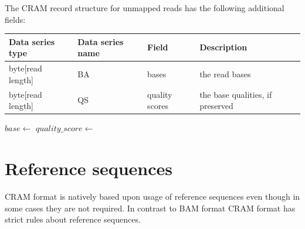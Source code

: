\documentclass[a4paper]{article}
\begin{document}
The CRAM record structure for unmapped reads has the following additional fields:

\begin{tabular}{|>{\raggedright}p{88pt}|>{\raggedright}p{83pt}|>{\raggedright}p{85pt}|>{\raggedright}p{180pt}|}
\hline
\textbf{Data series type} & \textbf{Data series name} & \textbf{Field} & \textbf{Description}\tabularnewline
\hline
byte[read length] & BA & bases & the read bases\tabularnewline
\hline
byte[read length] & QS & quality scores & the base qualities, if preserved\tabularnewline
\hline
\end{tabular}

\vskip20pt
\begin{algorithmic}[1]
    \State $base\gets$ 
  \EndFor
      \State $quality\_score\gets$ 
    \EndFor
  \EndIf
\EndProcedure
\end{algorithmic}

\section{\textbf{Reference sequences}}

CRAM format is natively based upon usage of reference sequences even though in 
some cases they are not required. In contrast to BAM format CRAM format has strict 
rules about reference sequences. 
\end{document}
